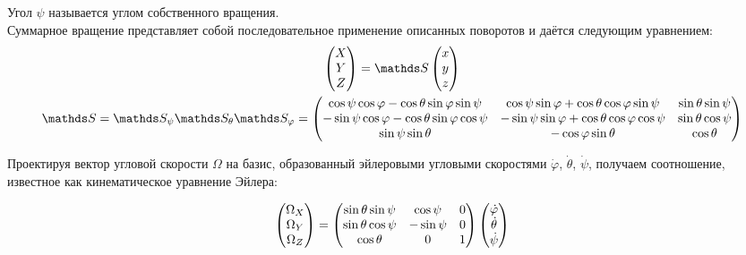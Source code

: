 Угол $\psi$ называется углом собственного вращения.\\

\hspace{0.48cm} Суммарное вращение представляет собой последовательное применение описанных поворотов и даётся следующим уравнением: 
\begin{gather}
\begin{pmatrix}
X \\
Y \\
Z
\end{pmatrix} = 
\bbS 
\begin{pmatrix}
x \\
y \\
z
\end{pmatrix} \notag \\
\bbS = \bbS_\psi \bbS_\theta \bbS_\varphi = 
\begin{pmatrix}
\cos \psi \cos \varphi - \cos \theta \sin \varphi \sin \psi & \cos \psi \sin \varphi + \cos \theta \cos \varphi \sin \psi & \sin \theta \sin \psi \\
- \sin \psi \cos \varphi - \cos \theta \sin \varphi \cos \psi & - \sin \psi \sin \varphi + \cos \theta \cos \varphi \cos \psi & \sin \theta \cos \psi \\
\sin \psi \sin \theta & - \cos \varphi \sin \theta & \cos \theta 
\end{pmatrix} \notag
\end{gather}

Проектируя вектор угловой скорости $\Omega$ на базис, образованный эйлеровыми угловыми скоростями $\dot{\varphi}$, $\dot{\theta}$, $\dot{\psi}$, получаем соотношение, известное как кинематическое уравнение Эйлера:

\begin{gather}
\begin{pmatrix}
\Omega_X \\
\Omega_Y \\
\Omega_Z
\end{pmatrix} =
\begin{pmatrix}
\sin \theta \sin \psi & \cos \psi & 0 \\
\sin \theta \cos \psi & - \sin \psi & 0 \\
\cos \theta & 0 & 1
\end{pmatrix}
\begin{pmatrix}
\dot{\varphi} \\
\dot{\theta} \\
\dot{\psi}
\end{pmatrix} \notag
\end{gather}


